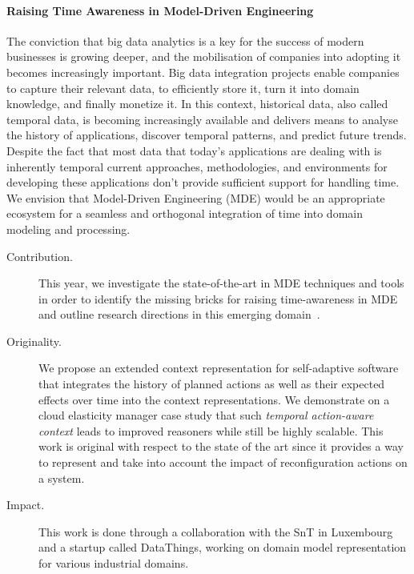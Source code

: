 \paragraph{Raising Time Awareness in Model-Driven Engineering}

The conviction that big data analytics is a key for the
success of modern businesses is growing deeper, and the mobilisation
of companies into adopting it becomes increasingly
important. Big data integration projects enable companies
to capture their relevant data, to efficiently store it, turn
it into domain knowledge, and finally monetize it. In this
context, historical data, also called temporal data, is becoming
increasingly available and delivers means to analyse the history
of applications, discover temporal patterns, and predict future
trends. Despite the fact that most data that today’s applications
are dealing with is inherently temporal current approaches,
methodologies, and environments for developing these applications
don’t provide sufficient support for handling time. We
envision that Model-Driven Engineering (MDE) would be an
appropriate ecosystem for a seamless and orthogonal integration
of time into domain modeling and processing. 

\begin{description}

\item[Contribution.] This year, we investigate the state-of-the-art in MDE techniques and tools in order to identify the missing bricks for raising time-awareness in MDE and outline research directions in this emerging domain~\cite{benelallam:hal-01580554}.

\item[Originality.] We propose an extended context representation for self-adaptive software that integrates the history of planned actions as well as their expected effects over time into the context representations.
We demonstrate on a cloud elasticity manager case study that such \textit{temporal action-aware context} leads to improved reasoners while still be highly scalable. This work is original with respect to the state of the art since it provides a way to represent and take into account the impact of reconfiguration actions on a system.

\item[Impact.] This work is done through a collaboration with the SnT in Luxembourg and a startup called DataThings, working on domain model representation for various industrial domains.
\end{description}

